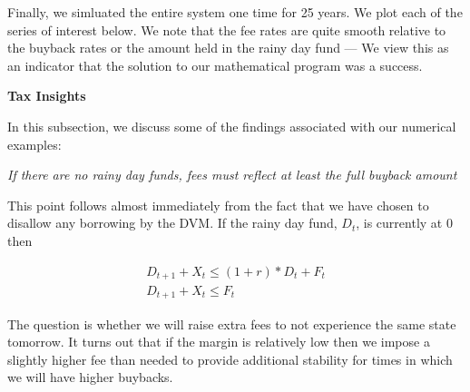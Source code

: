 Finally, we simluated the entire system one time for 25 years. We plot each of the series of
interest below. We note that the fee rates are quite smooth relative to the buyback rates or the
amount held in the rainy day fund --- We view this as an indicator that the solution to our
mathematical program was a success.

\begin{center}
  \begin{figure}[H]
    \label{fig:sm_simulationplots}
  \end{figure}
\end{center}

\textbf{Tax Insights}

In this subsection, we discuss some of the findings associated with our numerical examples:

\vspace{0.25cm}

\textit{If there are no rainy day funds, fees must reflect at least the full buyback amount}

This point follows almost immediately from the fact that we have chosen to disallow any borrowing by
the DVM. If the rainy day fund, $D_t$, is currently at 0 then

\begin{align*}
  D_{t+1} + X_{t} \leq (1 + r)*D_t + F_t \\
  D_{t+1} + X_{t} \leq F_t
\end{align*}

The question is whether we will raise extra fees to not experience the same state tomorrow. It
turns out that if the margin is relatively low then we impose a slightly higher fee than needed to
provide additional stability for times in which we will have higher buybacks.

